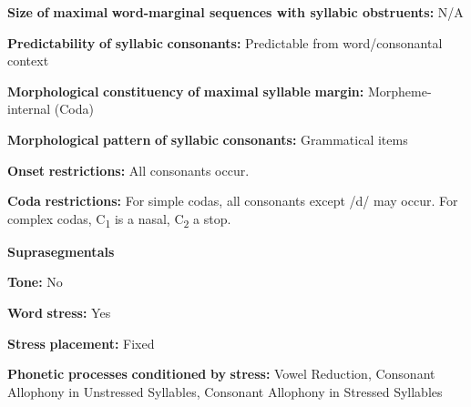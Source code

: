 \begin{styleBody}
\textbf{Size} \textbf{of} \textbf{maximal} \textbf{word{}-marginal sequences with syllabic obstruents:} N/A
\end{styleBody}

\begin{styleBody}
\textbf{Predictability} \textbf{of} \textbf{syllabic} \textbf{consonants:} Predictable from word/consonantal context
\end{styleBody}

\begin{styleBody}
\textbf{Morphological} \textbf{constituency} \textbf{of} \textbf{maximal} \textbf{syllable} \textbf{margin:} Morpheme-internal (Coda)
\end{styleBody}

\begin{styleBody}
\textbf{Morphological} \textbf{pattern} \textbf{of} \textbf{syllabic} \textbf{consonants:} Grammatical items
\end{styleBody}

\begin{styleBody}
\textbf{Onset} \textbf{restrictions:} All consonants occur.
\end{styleBody}

\begin{styleBody}
\textbf{Coda} \textbf{restrictions:} For simple codas, all consonants except /d/ may occur. For complex codas, C\textsubscript{1} is a nasal, C\textsubscript{2} a stop.
\end{styleBody}

\begin{styleBody}
\textbf{Suprasegmentals}
\end{styleBody}

\begin{styleBody}
\textbf{Tone:} No
\end{styleBody}

\begin{styleBody}
\textbf{Word} \textbf{stress:} Yes
\end{styleBody}

\begin{styleBody}
\textbf{Stress} \textbf{placement:} Fixed
\end{styleBody}

\begin{styleBody}
\textbf{Phonetic} \textbf{processes} \textbf{conditioned} \textbf{by} \textbf{stress:} Vowel Reduction, Consonant Allophony in Unstressed Syllables, Consonant Allophony in Stressed Syllables
\end{styleBody}

